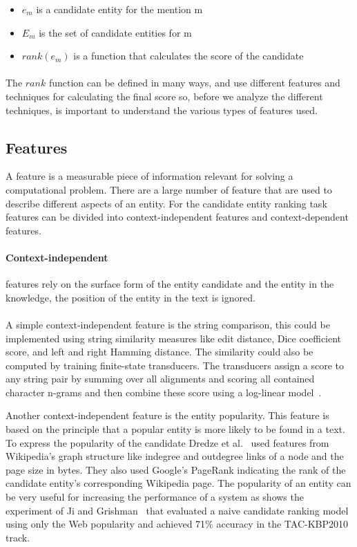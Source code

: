 \begin{itemize}[noitemsep,  topsep=10pt]
\item $e_m$ is a candidate entity for the mention m
\item $E_m$ is the set of candidate entities for m
\item $rank(e_m)$ is a function that calculates the score of the candidate
\end{itemize}

\paragraph{}
The $rank$ function can be defined in many ways, and use different features and techniques for calculating the final score so, before we analyze the different techniques, is important to understand the various types of features used.

\subsection{Features}
A feature is a measurable piece of information relevant for solving a computational problem. There are a large number of feature that are used to describe different aspects of an entity. For the candidate entity ranking task features can be divided into context-independent features and context-dependent features.
\pagebreak
\paragraph{Context-independent} features rely on the surface form of the entity candidate and the entity in the knowledge, the position of the entity in the text is ignored. 

\paragraph{} 
A simple context-independent feature is the string comparison, this could be implemented using string similarity measures like edit distance, Dice coefficient score, and left and right Hamming distance. The similarity could also be computed by training finite-state transducers. The transducers assign a score to any string pair by summing over all alignments and scoring all contained character n-grams and then combine these score using a log-linear model~\cite{dredze2010entity}.

Another context-independent feature is the entity popularity. This feature is based on the principle that a popular entity is more likely to be found in a text. To express the popularity of the candidate Dredze et al.~\cite{dredze2010entity} used features from Wikipedia's graph structure like indegree and outdegree links of a node and the page size in bytes. They also used Google's PageRank indicating the rank of the candidate entity's corresponding Wikipedia page. The popularity of an entity can be very useful for increasing the performance of a system as shows the experiment of Ji and Grishman~\cite{ji2011knowledge} that evaluated a naive candidate ranking model using only the Web popularity and achieved 71\% accuracy in the TAC-KBP2010 track.

